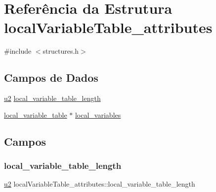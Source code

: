 \hypertarget{structlocalVariableTable__attributes}{}\section{Referência da Estrutura local\+Variable\+Table\+\_\+attributes}
\label{structlocalVariableTable__attributes}


{\ttfamily \#include $<$structures.\+h$>$}

\subsection*{Campos de Dados}
\begin{DoxyCompactItemize}
\item 
\hyperlink{lista__operandos_8h_a732cde1300aafb73b0ea6c2558a7a54f}{u2} \hyperlink{structlocalVariableTable__attributes_a3ae381679f6b069984bfec2618cc40e4}{local\+\_\+variable\+\_\+table\+\_\+length}
\item 
\hyperlink{structlocal__variable__table}{local\+\_\+variable\+\_\+table} $\ast$ \hyperlink{structlocalVariableTable__attributes_a78911369e8a4c58d93f579613144a8c2}{local\+\_\+variables}
\end{DoxyCompactItemize}


\subsection{Campos}
\mbox{\label{structlocalVariableTable__attributes_a3ae381679f6b069984bfec2618cc40e4}} 
\subsubsection{\texorpdfstring{local\+\_\+variable\+\_\+table\+\_\+length}{local\_variable\_table\_length}}
{\footnotesize\ttfamily \hyperlink{lista__operandos_8h_a732cde1300aafb73b0ea6c2558a7a54f}{u2} local\+Variable\+Table\+\_\+attributes\+::local\+\_\+variable\+\_\+table\+\_\+length}

\mbox{\label{structlocalVariableTable__attributes_a78911369e8a4c58d93f579613144a8c2}} 
